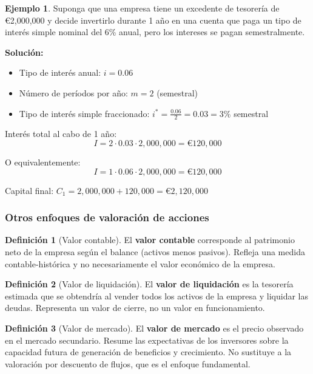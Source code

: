 \documentclass[12pt,a4paper]{article}
\theoremstyle{definition}
\newtheorem{definicion}{Definición}[section]
\newtheorem{ejemplo}{Ejemplo}[section]
\begin{document}
\begin{ejemplo}
Suponga que una empresa tiene un excedente de tesorería de €2,000,000 y decide invertirlo durante 1 año en una cuenta que paga un tipo de interés simple nominal del 6\% anual, pero los intereses se pagan semestralmente.

\textbf{Solución:}
\begin{itemize}
\item Tipo de interés anual: $i = 0.06$
\item Número de períodos por año: $m = 2$ (semestral)
\item Tipo de interés simple fraccionado: $i^* = \frac{0.06}{2} = 0.03 = 3\%$ semestral
\end{itemize}

Interés total al cabo de 1 año:
$$I = 2 \cdot 0.03 \cdot 2{,}000{,}000 = \text{€}120{,}000$$

O equivalentemente:
$$I = 1 \cdot 0.06 \cdot 2{,}000{,}000 = \text{€}120{,}000$$

Capital final: $C_1 = 2{,}000{,}000 + 120{,}000 = \text{€}2{,}120{,}000$
\end{ejemplo}

\subsubsection{Otros enfoques de valoración de acciones}

\begin{definicion}[Valor contable]
El \textbf{valor contable} corresponde al patrimonio neto de la empresa según el balance (activos menos pasivos). Refleja una medida contable-histórica y no necesariamente el valor económico de la empresa.
\end{definicion}

\begin{definicion}[Valor de liquidación]
El \textbf{valor de liquidación} es la tesorería estimada que se obtendría al vender todos los activos de la empresa y liquidar las deudas. Representa un valor de cierre, no un valor en funcionamiento.
\end{definicion}

\begin{definicion}[Valor de mercado]
El \textbf{valor de mercado} es el precio observado en el mercado secundario. Resume las expectativas de los inversores sobre la capacidad futura de generación de beneficios y crecimiento. No sustituye a la valoración por descuento de flujos, que es el enfoque fundamental.
\end{definicion}
\end{document}
